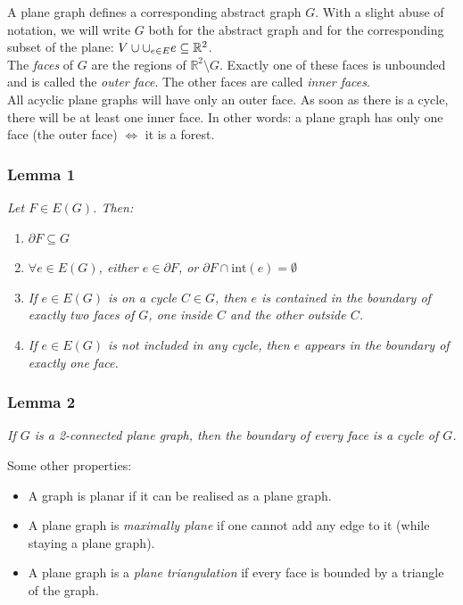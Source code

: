 \documentclass[11pt]{book}
\begin{document}
		A plane graph defines a corresponding abstract graph $G$. With a slight abuse of notation, we will write $G$ both for the abstract graph and for the corresponding subset of the plane: $V \cup \Large{\cup_{e \in E}} e \subseteq \mathbb{R}^2$.\\
		
		The \textit{faces} of $G$ are the regions of $\mathbb{R}^2 \setminus G$. Exactly one of these faces is unbounded and is called the \textit{outer face}. The other faces are called \textit{inner faces}. \\
		
		All acyclic plane graphs will have only an outer face. As soon as there is a cycle, there will be at least one inner face. In other words: a plane graph has only one face (the outer face) $\iff$ it is a forest. 
		
		\subsubsection{Lemma 1} 
		\textit{Let $F \in E(G)$. Then:}
		\begin{enumerate}
			\item $\partial F \subseteq G$
			\item \textit{$\forall e \in E(G)$, either $e \in \partial F$, or $\partial F \cap \text{int}(e) = \emptyset$}
			\item \textit{If $e \in E(G)$ is on a cycle $C \in G$, then $e$ is contained in the boundary of exactly two faces of $G$, one inside $C$ and the other outside $C$.}
			\item \textit{If $e \in E(G)$ is not included in any cycle, then $e$ appears in the boundary of exactly one face.}
		\end{enumerate}
		
		
		\subsubsection{Lemma 2}
		\textit{If $G$ is a 2-connected plane graph, then the boundary of every face is a cycle of $G$.\\}
		
		Some other properties:
		\begin{itemize}
			\item A graph is planar if it can be realised as a plane graph.
			\item A plane graph is \textit{maximally plane} if one cannot add any edge to it (while staying a plane graph).
			\item A plane graph is a \textit{plane triangulation} if every face is bounded by a triangle of the graph.
		\end{itemize}
		
\end{document}

